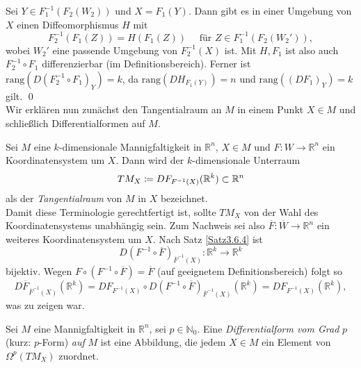 \documentclass[a4paper,twoside,DIV15,BCOR12mm]{scrbook}
\begin{document}
\bigskip

 Sei $Y \in F_{1}^{-1}(F_{2}(W_{2}))$ und $X = 
F_{1}(Y)$. Dann gibt es in einer Umgebung von $X$ einen 
Diffeomorphismus $H$ mit
\[ F_{2}^{-1}(F_{1}(Z)) = H(F_{1}(Z)) \quad \mbox{ für } Z \in 
F_{1}^{-1}(F_{2}(W_{2}')), \]
wobei $W_{2}'$ eine passende Umgebung von $F_{2}^{-1}(X)$ ist. Mit 
$H, F_{1}$ ist also auch $F_{2}^{-1} \circ F_{1}$ differenzierbar (im 
Definitionsbereich).  Ferner ist 
$\text{rang}(D(F_{2}^{-1} \circ F_{1})_Y)=k$, da $\text{rang}(DH_{F_1(Y)})=n$ 
und $\text{rang}((DF_1)_{Y})=k$ gilt. 
\qed\\



\noindent Wir erklären nun zunächst den Tangentialraum an $M$ in 
einem Punkt $X \in M$ und schließlich Differentialformen auf $M$.

\bigskip

 Sei $M$ eine $k$-dimensionale 
Mannigfaltigkeit in ${\mathbb R}^{n}$, $X \in M$ und $F: W \to 
{\mathbb R}^{n}$ ein Koordinatensystem um $X$. Dann wird der 
$k$-dimensionale Unterraum
\[ TM_{X} \da  DF_{F^{-1}(X)} ({\mathbb R}^{k}) \subset {\mathbb R}^{n} 
\]
als der {\em Tangentialraum} von $M$ in $X$ bezeichnet.\\

\noindent
Damit diese Terminologie gerechtfertigt ist, sollte $TM_{X}$ von der 
Wahl des Koordinatensystems unabhängig sein. 
Zum Nachweis sei also $\overline{F}: \overline{W} \to {\mathbb R}^{n}$ ein weiteres 
Koordinatensystem um $X$. Nach Satz \ref{Satz3.6.4} ist
\[ D(F^{-1} \circ \overline{F})_{\overline{F}^{-1}(X)}: {\mathbb 
R}^{k} \to {\mathbb R}^{k} \]
bijektiv. Wegen $F \circ (F^{-1} \circ \overline{F}) = \overline{F}$ 
(auf geeignetem Definitionsbereich) folgt so
\[
D\overline{F}_{\overline{F}^{-1}(X)} ({\mathbb R}^{k})  =  
DF_{F^{-1}(X)} \circ D(F^{-1} \circ 
\overline{F})_{\overline{F}^{-1}(X)} ({\mathbb R}^{k}) 
 =  DF_{F^{-1}(X)}({\mathbb R}^{k}),
\]
was zu zeigen war.



\bigskip

 Sei $M$ eine Mannigfaltigkeit in ${\mathbb 
R}^{n}$, sei $p \in {\mathbb N}_{0}$. Eine {\em Differentialform vom Grad}  
$p$ (kurz: $p$-Form) {\em auf} $M$ ist eine Abbildung, die jedem $X \in M$ 
ein Element von $\Omega^{p}(TM_{X})$ zuordnet.

\bigskip
\end{document}
